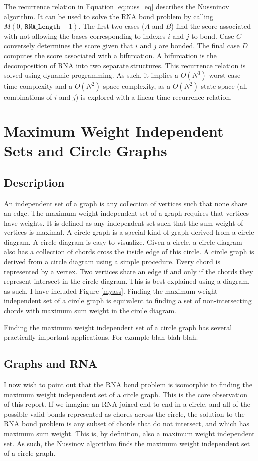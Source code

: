 \documentclass[12pt, a4paper]{article}
\begin{document}
The recurrence relation in Equation \ref{eq:nuss_eq} describes the Nussninov algorithm. It can be used to solve the RNA bond problem by calling $M(0, \: \texttt{RNA\_Length}-1)$. The first two cases ($A$ and $B$) find the score associated with not allowing the bases corresponding to indexes $i$ and $j$ to bond. Case $C$ conversely determines the score given that $i$ and $j$ are bonded. The final case $D$ computes the score associated with a bifurcation. A bifurcation is the decomposition of RNA into two separate structures. This recurrence relation is solved using dynamic programming. As such, it implies a $O(N^3)$
worst case time complexity and a $O(N^2)$ space complexity, as a $O(N^2)$ state space (all combinations of $i$ and $j$) is explored
with a linear time recurrence relation.


\section{Maximum Weight Independent Sets and Circle Graphs}
\subsection{Description}
An independent set of a graph is any collection of vertices such that none share an edge. The maximum weight independent set of a graph requires that vertices have weights. It is defined as any independent set such that the sum weight of vertices is maximal. A circle graph is a special kind of graph derived from a circle diagram. A circle diagram is easy to visualize. Given a circle, a circle diagram also has a collection of chords cross the inside edge of this circle. A circle graph is derived from a circle diagram using a simple procedure. Every chord is represented by a vertex. Two vertices share an edge if and only if the chords they represent intersect in the circle diagram. This is best explained using a diagram, as such, I have included Figure \ref{myass}. Finding the maximum weight independent set of a circle graph is equivalent to finding a set of non-intersecting chords with maximum sum weight in the circle diagram.

Finding the maximum weight independent set of a circle graph has several practically important applications. For example blah blah blah.

\subsection{Graphs and RNA}
I now wish to point out that the RNA bond problem is isomorphic to finding the maximum weight independent set of a circle graph. This is the core observation of this report. If we imagine an RNA joined end to end in a circle, and all of the possible valid bonds represented as chords across the circle, the solution to the RNA bond problem is any subset of chords that do not intersect, and which has maximum sum weight. This is, by definition, also a maximum weight independent set. As such, the Nussinov algorithm finds the maximum weight independent set of a circle graph.
\end{document}
